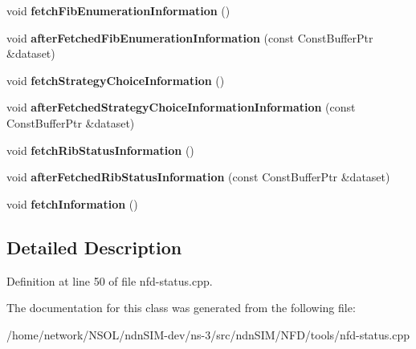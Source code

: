\begin{DoxyCompactItemize}
\item 
void {\bfseries fetch\+Fib\+Enumeration\+Information} ()\hypertarget{classndn_1_1NfdStatus_a955b3b0d60f9be5c7965b4cc6253007c}{}\label{classndn_1_1NfdStatus_a955b3b0d60f9be5c7965b4cc6253007c}

\item 
void {\bfseries after\+Fetched\+Fib\+Enumeration\+Information} (const Const\+Buffer\+Ptr \&dataset)\hypertarget{classndn_1_1NfdStatus_a2e28ec4c71a608ae6076459c1b20399b}{}\label{classndn_1_1NfdStatus_a2e28ec4c71a608ae6076459c1b20399b}

\item 
void {\bfseries fetch\+Strategy\+Choice\+Information} ()\hypertarget{classndn_1_1NfdStatus_a335f795696ffd6963579003d98609af5}{}\label{classndn_1_1NfdStatus_a335f795696ffd6963579003d98609af5}

\item 
void {\bfseries after\+Fetched\+Strategy\+Choice\+Information\+Information} (const Const\+Buffer\+Ptr \&dataset)\hypertarget{classndn_1_1NfdStatus_ad45a74ea5dd69546e8c308a7775cd141}{}\label{classndn_1_1NfdStatus_ad45a74ea5dd69546e8c308a7775cd141}

\item 
void {\bfseries fetch\+Rib\+Status\+Information} ()\hypertarget{classndn_1_1NfdStatus_ab2945efad13a83e0e67c0861bd9217eb}{}\label{classndn_1_1NfdStatus_ab2945efad13a83e0e67c0861bd9217eb}

\item 
void {\bfseries after\+Fetched\+Rib\+Status\+Information} (const Const\+Buffer\+Ptr \&dataset)\hypertarget{classndn_1_1NfdStatus_a512f8d4f4ff712b84d5e684fbc0fb61e}{}\label{classndn_1_1NfdStatus_a512f8d4f4ff712b84d5e684fbc0fb61e}

\item 
void {\bfseries fetch\+Information} ()\hypertarget{classndn_1_1NfdStatus_af353a001c33df9c08d0a6e30e01a241c}{}\label{classndn_1_1NfdStatus_af353a001c33df9c08d0a6e30e01a241c}

\end{DoxyCompactItemize}


\subsection{Detailed Description}


Definition at line 50 of file nfd-\/status.\+cpp.



The documentation for this class was generated from the following file\+:\begin{DoxyCompactItemize}
\item 
/home/network/\+N\+S\+O\+L/ndn\+S\+I\+M-\/dev/ns-\/3/src/ndn\+S\+I\+M/\+N\+F\+D/tools/nfd-\/status.\+cpp\end{DoxyCompactItemize}
